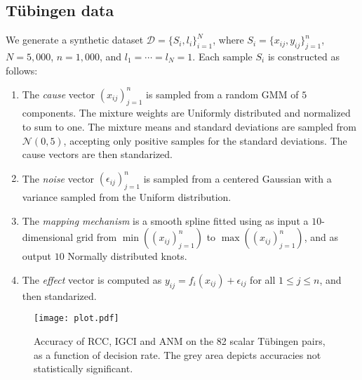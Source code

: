 \documentclass[twoside,11pt,a4paper]{article}
\begin{document}
\subsection{T\"ubingen data}
We generate a synthetic dataset $\mathcal{D} = \{S_i,l_i\}_{i=1}^{N}$, where
$S_i = \{x_{ij},y_{ij}\}_{j=1}^{n}$, $N = 5,000$, $n = 1,000$, and $l_1 =
\cdots = l_{N} = 1$. Each sample $S_i$ is constructed as follows:
\begin{enumerate}
  \item The \emph{cause} vector $(x_{ij})_{j=1}^{n}$ is sampled from a random
  GMM of $5$ components. The mixture weights are Uniformly distributed and
  normalized to sum to one. The mixture means and standard deviations are
  sampled from $\mathcal{N}(0,5)$, accepting only positive samples for the
  standard deviations. The cause vectors are then standarized.
  \item The \emph{noise} vector $(\epsilon_{ij})_{j=1}^{n}$ is sampled from a
  centered Gaussian with a variance sampled from the Uniform distribution.
  \item The \emph{mapping mechanism} is a smooth spline fitted using as
  input a $10$-dimensional grid from $\min((x_{ij})_{j=1}^n)$
  to $\max((x_{ij})_{j=1}^n)$, and as output $10$ Normally distributed
  knots.
  \item The \emph{effect} vector is computed as $y_{ij} =
  f_i(x_{ij})+\epsilon_{ij}$ for all $1 \leq j \leq n$, and then standarized.
\end{enumerate}

\begin{figure}[t]
  \begin{center}
    \texttt{[image: plot.pdf]} 
  \end{center}
  \vskip -0.5cm
  \caption{Accuracy of RCC, IGCI and ANM on the 82 scalar
  T\"ubingen pairs, as a function of decision rate. The grey area
  depicts accuracies not statistically significant.}
  \label{fig:tuebingen}
\end{figure}
\end{document}
